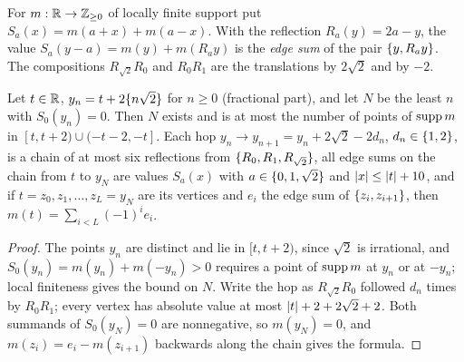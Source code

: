 For $m:\mathbb{R}\to\mathbb{Z}_{\ge0}$ of locally finite support put $S_a(x)=m(a+x)+m(a-x)$. With the reflection
$R_a(y)=2a-y$, the value $S_a(y-a)=m(y)+m(R_ay)$ is the \emph{edge sum} of the pair $\{y,R_ay\}$. The compositions
$R_{\sqrt2}R_0$ and $R_0R_1$ are the translations by $2\sqrt2$ and by $-2$.

\begin{proposition}\label{rec:prop:stop}
Let $t\in\mathbb{R}$, $y_n=t+2\{n\sqrt2\}$ for $n\ge0$ (fractional part), and let $N$ be the least $n$ with
$S_0(y_n)=0$. Then $N$ exists and is at most the number of points of $\operatorname{supp} m$ in
$[t,t+2)\cup(-t-2,-t]$. Each hop $y_n\to y_{n+1}=y_n+2\sqrt2-2d_n$, $d_n\in\{1,2\}$, is a chain of at most six
reflections from $\{R_0,R_1,R_{\sqrt2}\}$, all edge sums on the chain from $t$ to $y_N$ are values $S_a(x)$
with $a\in\{0,1,\sqrt2\}$ and $\lvert x\rvert\le\lvert t\rvert+10$, and if $t=z_0,z_1,\dots,z_L=y_N$ are its vertices and $e_i$
the edge sum of $\{z_i,z_{i+1}\}$, then $m(t)=\sum_{i<L}(-1)^ie_i$.
\end{proposition}

\begin{proof}
The points $y_n$ are distinct and lie in $[t,t+2)$, since $\sqrt2$ is irrational, and
$S_0(y_n)=m(y_n)+m(-y_n)>0$ requires a point of $\operatorname{supp} m$ at $y_n$ or at $-y_n$; local finiteness gives the
bound on $N$. Write the hop as $R_{\sqrt2}R_0$ followed $d_n$ times by $R_0R_1$; every vertex has absolute
value at most $\lvert t\rvert+2+2\sqrt2+2$. Both summands of $S_0(y_N)=0$ are nonnegative, so $m(y_N)=0$, and
$m(z_i)=e_i-m(z_{i+1})$ backwards along the chain gives the formula.
\end{proof}

